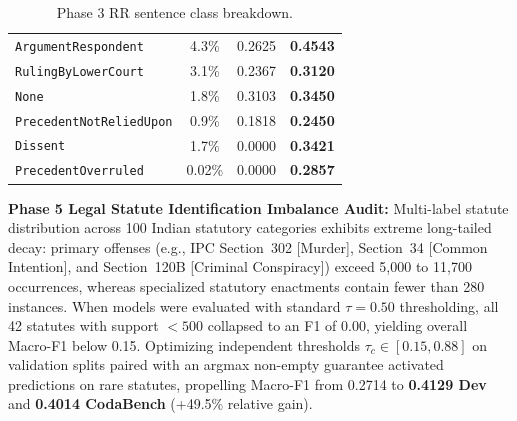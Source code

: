 \documentclass[11pt, oneside]{article}
\begin{document}
\begin{table}[htbp]
\begin{minipage}[t]{0.50\textwidth}
\begin{tabular}{lccc}
\texttt{ArgumentRespondent} & 4.3\% & 0.2625 & \textbf{0.4543} \\
\texttt{RulingByLowerCourt} & 3.1\% & 0.2367 & \textbf{0.3120} \\
\texttt{None} & 1.8\% & 0.3103 & \textbf{0.3450} \\
\texttt{PrecedentNotReliedUpon} & 0.9\% & 0.1818 & \textbf{0.2450} \\
\texttt{Dissent} & 1.7\% & 0.0000 & \textbf{0.3421} \\
\texttt{PrecedentOverruled} & 0.02\% & 0.0000 & \textbf{0.2857} \\
\bottomrule
\end{tabular}
\caption{Phase 3 RR sentence class breakdown.}
\label{tab:p3_classes}
\end{minipage}
\end{table}

\noindent
\textbf{Phase 5 Legal Statute Identification Imbalance Audit:} Multi-label statute distribution across 100 Indian statutory categories exhibits extreme long-tailed decay: primary offenses (e.g., IPC Section~302 [Murder], Section~34 [Common Intention], and Section~120B [Criminal Conspiracy]) exceed 5,000 to 11,700 occurrences, whereas specialized statutory enactments contain fewer than 280 instances. When models were evaluated with standard $\tau=0.50$ thresholding, all 42 statutes with support $<500$ collapsed to an F1 of 0.00, yielding overall Macro-F1 below 0.15. Optimizing independent thresholds $\tau_c \in [0.15, 0.88]$ on validation splits paired with an argmax non-empty guarantee activated predictions on rare statutes, propelling Macro-F1 from 0.2714 to \textbf{0.4129 Dev} and \textbf{0.4014 CodaBench} (+49.5\% relative gain).
\end{document}
